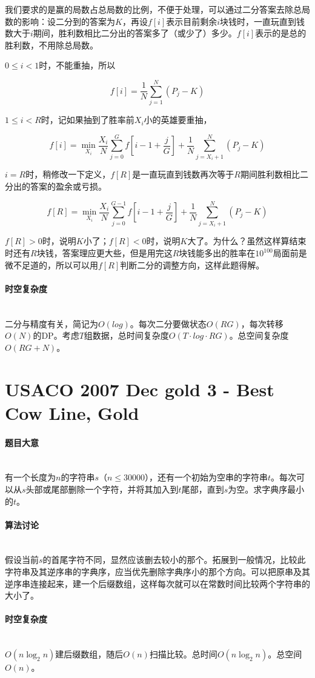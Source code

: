 \documentclass[UTF8]{ctexart}
\newcommand{\myparagraph}[1]{\paragraph{#1}\mbox{}\\}
\theoremstyle{nonumberplain}
\begin{document}
			我们要求的是赢的局数占总局数的比例，不便于处理，可以通过二分答案去除总局数的影响：设二分到的答案为$K$，再设$f[i]$表示目前剩余$i$块钱时，一直玩直到钱数大于$i$期间，胜利数相比二分出的答案多了（或少了）多少。$f[i]$表示的是总的胜利数，不用除总局数。
			
			$0 \leq i < 1$时，不能重抽，所以
			
			$$f[i]=\frac{1}{N}\sum_{j=1}^N(P_j-K)$$
			
			$1 \leq i < R$时，记如果抽到了胜率前$X_i$小的英雄要重抽，
			
			$$f[i]=\min_{X_i} \frac{X_i}{N}\sum_{j=0}^G f[i-1+\frac{j}{G}] + \frac{1}{N}\sum_{j=X_i+1}^N(P_j-K)$$
			
			$i=R$时，稍修改一下定义，$f[R]$是一直玩直到钱数再次等于$R$期间胜利数相比二分出的答案的盈余或亏损。
			
			$$f[R]=\min_{X_i} \frac{X_i}{N}\sum_{j=0}^{G-1} f[i-1+\frac{j}{G}] + \frac{1}{N}\sum_{j=X_i+1}^N(P_j-K)$$
			
			$f[R]>0$时，说明$K$小了；$f[R]<0$时，说明$K$大了。为什么？虽然这样算结束时还有$R$块钱，答案理应更大些，但是用完这$R$块钱能多出的胜率在$10^{100}$局面前是微不足道的，所以可以用$f[R]$判断二分的调整方向，这样此题得解。
		
		\myparagraph{时空复杂度}
		
			二分与精度有关，简记为$O(log)$。每次二分要做状态$O(RG)$，每次转移$O(N)$的DP。考虑$T$组数据，总时间复杂度$O(T \cdot log \cdot RG)$。总空间复杂度$O(RG+N)$。
	
	\section{USACO 2007 Dec gold 3 - Best Cow Line, Gold}
	
		\myparagraph{题目大意}
		
			有一个长度为$n$的字符串$s$（$n \leq 30000$），还有一个初始为空串的字符串$t$。每次可以从$s$头部或尾部删除一个字符，并将其加入到$t$尾部，直到$s$为空。求字典序最小的$t$。
		
		\myparagraph{算法讨论}
		
			假设当前$s$的首尾字符不同，显然应该删去较小的那个。拓展到一般情况，比较此字符串及其逆序串的字典序，应当优先删除字典序小的那个方向。可以把原串及其逆序串连接起来，建一个后缀数组，这样每次就可以在常数时间比较两个字符串的大小了。
		
		\myparagraph{时空复杂度}
		
			$O(n\log_2n)$建后缀数组，随后$O(n)$扫描比较。总时间$O(n\log_2n)$。总空间$O(n)$。
	
\end{document}
